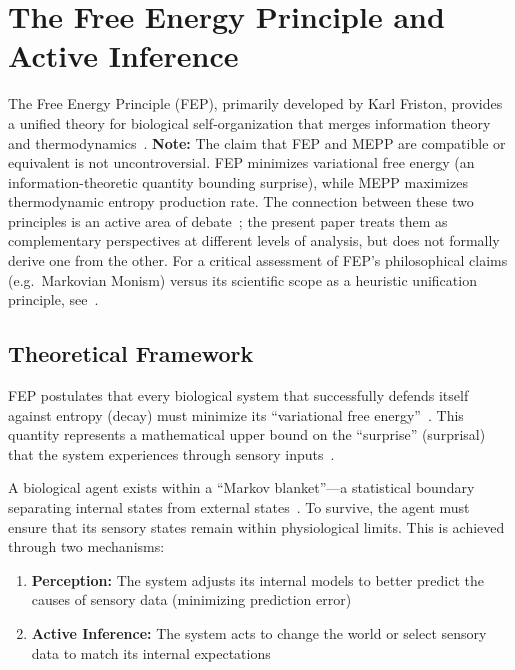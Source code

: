 \documentclass[12pt,a4paper]{article}
\theoremstyle{remark}
\begin{document}
\section{The Free Energy Principle and Active Inference}
\label{sec:fep}

The Free Energy Principle (FEP), primarily developed by Karl Friston, provides a unified theory for biological self-organization that merges information theory and thermodynamics~\citep{FristonFreeEnergy,FristonPDF}. \textbf{Note:} The claim that FEP and MEPP are compatible or equivalent is not uncontroversial. FEP minimizes variational free energy (an information-theoretic quantity bounding surprise), while MEPP maximizes thermodynamic entropy production rate. The connection between these two principles is an active area of debate~\citep{FristonFreeEnergy}; the present paper treats them as complementary perspectives at different levels of analysis, but does not formally derive one from the other. For a critical assessment of FEP's philosophical claims (e.g.\ Markovian Monism) versus its scientific scope as a heuristic unification principle, see~\citealp{SanchezCanizares2021}.

\subsection{Theoretical Framework}

FEP postulates that every biological system that successfully defends itself against entropy (decay) must minimize its ``variational free energy''~\citep{FristonFreeEnergy}. This quantity represents a mathematical upper bound on the ``surprise'' (surprisal) that the system experiences through sensory inputs~\citep{FristonFreeEnergy}.

A biological agent exists within a ``Markov blanket''---a statistical boundary separating internal states from external states~\citep{FristonPDF}. To survive, the agent must ensure that its sensory states remain within physiological limits. This is achieved through two mechanisms:

\begin{enumerate}
    \item \textbf{Perception:} The system adjusts its internal models to better predict the causes of sensory data (minimizing prediction error)~\citep{FristonFreeEnergy}
    \item \textbf{Active Inference:} The system acts to change the world or select sensory data to match its internal expectations~\citep{FristonFreeEnergy}
\end{enumerate}
\end{document}
